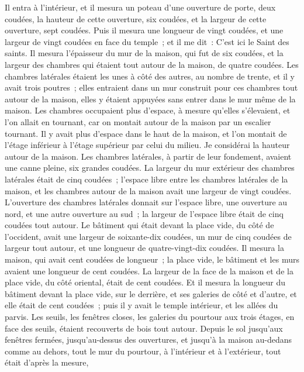 \begin{multicols}{2}
Il entra à l'intérieur, et il mesura un poteau d'une ouverture de porte, deux coudées, la hauteur de cette ouverture, six coudées, et la largeur de cette ouverture, sept coudées.
Puis il mesura une longueur de vingt coudées, et une largeur de vingt coudées en face du temple~; et il me dit~: C'est ici le Saint des saints.
Il mesura l'épaisseur du mur de la maison, qui fut de six coudées, et la largeur des chambres qui étaient tout autour de la maison, de quatre coudées.
Les chambres latérales étaient les unes à côté des autres, au nombre de trente, et il y avait trois poutres~; elles entraient dans un mur construit pour ces chambres tout autour de la maison, elles y étaient appuyées sans entrer dans le mur même de la maison.
Les chambres occupaient plus d'espace, à mesure qu'elles s'élevaient, et l'on allait en tournant, car on montait autour de la maison par un escalier tournant. Il y avait plus d'espace dans le haut de la maison, et l'on montait de l'étage inférieur à l'étage supérieur par celui du milieu.
Je considérai la hauteur autour de la maison. Les chambres latérales, à partir de leur fondement, avaient une canne pleine, six grandes coudées.
La largeur du mur extérieur des chambres latérales était de cinq coudées~; l'espace libre entre les chambres latérales de la maison,
et les chambres autour de la maison avait une largeur de vingt coudées.
L'ouverture des chambres latérales donnait sur l'espace libre, une ouverture au nord, et une autre ouverture au sud~; la largeur de l'espace libre était de cinq coudées tout autour.
Le bâtiment qui était devant la place vide, du côté de l'occident, avait une largeur de soixante-dix coudées, un mur de cinq coudées de largeur tout autour, et une longueur de quatre-vingt-dix coudées.
Il mesura la maison, qui avait cent coudées de longueur~; la place vide, le bâtiment et les murs avaient une longueur de cent coudées.
La largeur de la face de la maison et de la place vide, du côté oriental, était de cent coudées.
Et il mesura la longueur du bâtiment devant la place vide, sur le derrière, et ses galeries de côté et d'autre, et elle était de cent coudées~; puis il y avait le temple intérieur, et les allées du parvis.
Les seuils, les fenêtres closes, les galeries du pourtour aux trois étages, en face des seuils, étaient recouverts de bois tout autour. Depuis le sol jusqu'aux fenêtres fermées,
jusqu'au-dessus des ouvertures, et jusqu'à la maison au-dedans comme au dehors, tout le mur du pourtour, à l'intérieur et à l'extérieur, tout était d'après la mesure,

\end{multicols}
